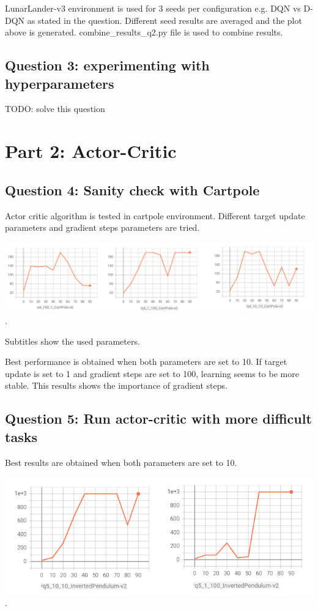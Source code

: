 \documentclass[11pt]{article}
\begin{document}
    LunarLander-v3 environment is used for 3 seeds per configuration e.g. DQN vs D-DQN as stated in the question.
    Different seed results are averaged and the plot above is generated.
    combine\_results\_q2.py file is used to combine results.

    \subsection*{Question 3: experimenting with hyperparameters}

    TODO: solve this question

    \section{Part 2: Actor-Critic}

    \subsection*{Question 4: Sanity check with Cartpole}

    Actor critic algorithm is tested in cartpole environment.
    Different target update parameters and gradient steps parameters are tried.

    \includegraphics[scale=1.5]{q4/q4}.

    Subtitles show the used parameters.

    Best performance is obtained when both parameters are set to 10.
    If target update is set to 1 and gradient steps are set to 100, learning seems to be more stable.
    This results shows the importance of gradient steps.

    \subsection*{Question 5: Run actor-critic with more difficult tasks}

    Best results are obtained when both parameters are set to 10.

    \includegraphics[scale=2]{q5/q5_inverted_pendulum}.
\end{document}
